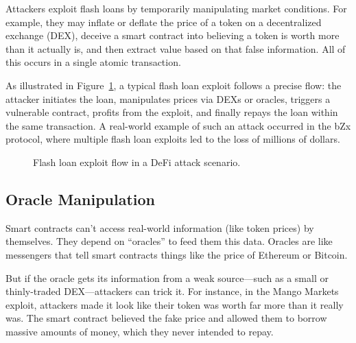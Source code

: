 \documentclass[conference]{IEEEtran}
\begin{document}
Attackers exploit flash loans by temporarily manipulating market conditions. For example, they may inflate or deflate the price of a token on a decentralized exchange (DEX), deceive a smart contract into believing a token is worth more than it actually is, and then extract value based on that false information. All of this occurs in a single atomic transaction.

As illustrated in Figure~\ref{fig:flashloan_tikz}, a typical flash loan exploit follows a precise flow: the attacker initiates the loan, manipulates prices via DEXs or oracles, triggers a vulnerable contract, profits from the exploit, and finally repays the loan within the same transaction. A real-world example of such an attack occurred in the bZx protocol, where multiple flash loan exploits led to the loss of millions of dollars.

\begin{figure}[H]
\centering
{}
\caption{Flash loan exploit flow in a DeFi attack scenario.}
\label{fig:flashloan_tikz}
\end{figure}

\subsection{Oracle Manipulation}

Smart contracts can't access real-world information (like token prices) by themselves. They depend on “oracles” to feed them this data. Oracles are like messengers that tell smart contracts things like the price of Ethereum or Bitcoin.

But if the oracle gets its information from a weak source—such as a small or thinly-traded DEX—attackers can trick it. For instance, in the Mango Markets exploit, attackers made it look like their token was worth far more than it really was. The smart contract believed the fake price and allowed them to borrow massive amounts of money, which they never intended to repay.
\end{document}

